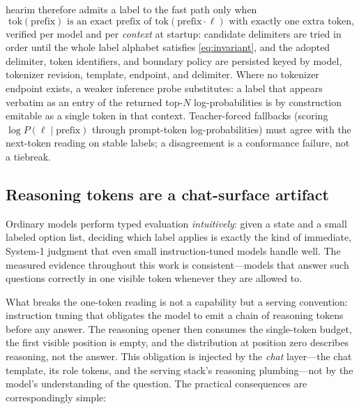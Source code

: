 \documentclass[11pt]{article}
\begin{document}
hearim therefore admits a label to the fast path only when
\begin{equation}
\mathrm{tok}(\text{prefix}) \text{ is an exact prefix of }
\mathrm{tok}(\text{prefix} \cdot \ell) \text{ with exactly one extra token,}
\label{eq:invariant}
\end{equation}
verified per model and per \emph{context} at startup: candidate delimiters
are tried in order until the whole label alphabet satisfies
\eqref{eq:invariant}, and the adopted delimiter, token identifiers, and
boundary policy are persisted keyed by model, tokenizer revision, template,
endpoint, and delimiter. Where no tokenizer endpoint exists, a weaker
inference probe substitutes: a label that appears verbatim as an entry of
the returned top-$N$ log-probabilities is by construction emitable as a
single token in that context. Teacher-forced fallbacks (scoring
$\log P(\ell \mid \text{prefix})$ through prompt-token log-probabilities)
must agree with the next-token reading on stable labels; a disagreement is
a conformance failure, not a tiebreak.

\subsection{Reasoning tokens are a chat-surface artifact}
\label{sec:reasoning}

Ordinary models perform typed evaluation \emph{intuitively}: given a state
and a small labeled option list, deciding which label applies is exactly
the kind of immediate, System-1 judgment that even small instruction-tuned
models handle well. The measured evidence throughout this work is
consistent---models that answer such questions correctly in one visible
token whenever they are allowed to.

What breaks the one-token reading is not a capability but a serving
convention: instruction tuning that obligates the model to emit a chain of
reasoning tokens before any answer. The reasoning opener then consumes the
single-token budget, the first visible position is empty, and the
distribution at position zero describes reasoning, not the answer. This
obligation is injected by the \emph{chat} layer---the chat template, its
role tokens, and the serving stack's reasoning plumbing---not by the
model's understanding of the question. The practical consequences are
correspondingly simple:
\end{document}
